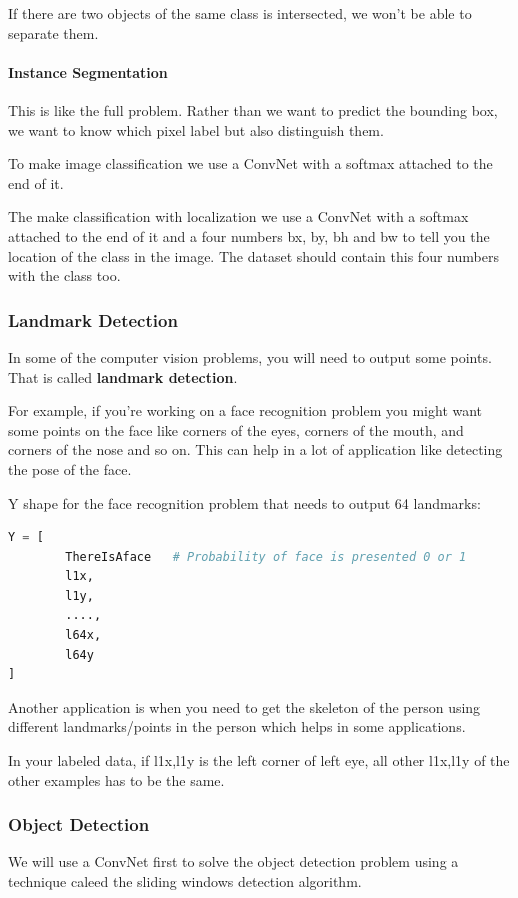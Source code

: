 If there are two objects of the same class is intersected, we won't be able to separate them.

\paragraph{Instance Segmentation} This is like the full problem. Rather than we want to predict the bounding box, we want to know which pixel label but also distinguish them.

To make image classification we use a ConvNet with a softmax attached to the end of it.

The make classification with localization we use a ConvNet with a softmax attached to the end of it and a four numbers bx, by, bh and bw to tell you the location of the class in the image. The dataset should contain this four numbers with the class too.

\subsubsection{Landmark Detection}
In some of the computer vision problems, you will need to output some points. That is called \textbf{landmark detection}.

For example, if you're working on a face recognition problem you might want some points on the face like corners of the eyes, corners of the mouth, and corners of the nose and so on. This can help in a lot of application like detecting the pose of the face.

Y shape for the face recognition problem that needs to output 64 landmarks:

\begin{lstlisting}[language=python]
Y = [
        ThereIsAface   # Probability of face is presented 0 or 1
        l1x,
        l1y,
        ....,
        l64x,
        l64y
]
\end{lstlisting}

Another application is when you need to get the skeleton of the person using different landmarks/points in the person which helps in some applications.

In your labeled data, if l1x,l1y is the left corner of left eye, all other l1x,l1y of the other examples has to be the same.

\subsubsection{Object Detection}
We will use a ConvNet first to solve the object detection problem using a technique caleed the sliding windows detection algorithm.

